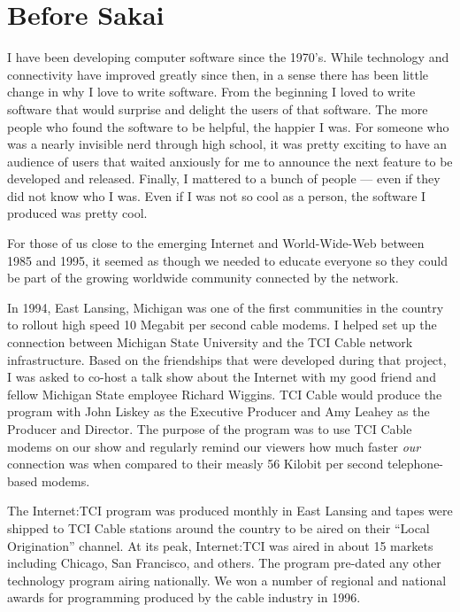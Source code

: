 \documentclass[12pt]{book}
\begin{document}
\tableofcontents

\mainmatter

\chapter{Before Sakai}

I have been developing computer software since the 1970's.  While
technology and connectivity have
improved greatly since then, in a sense there has been little change
in why I love to write software.  From the beginning I loved
to write software that would surprise and delight the users of
that software.  The more people who found the software
to be helpful, the happier I was.   For someone who was a nearly
invisible nerd through high school, it was pretty exciting to have
an audience of users that waited anxiously for me to announce
the next feature to be developed and released.  Finally, I mattered
to a bunch of people --- even if they did not know who I was.  Even if
I was not so cool as a person, the software I produced was pretty cool.

For those of us close to the emerging Internet and World-Wide-Web
between 1985 and 1995, it seemed as though we needed to
educate everyone so they could be part of the growing worldwide
community connected by the network.

In 1994, East Lansing, Michigan was one of the first communities
in the country to rollout high speed 10 Megabit per second cable
modems.  I helped set up the connection between Michigan State
University and the TCI Cable network infrastructure.   Based on the
friendships that were developed during that project, I was asked
to co-host a talk show about the Internet with my good friend
and fellow Michigan State employee Richard Wiggins.  TCI Cable
would produce the program with John Liskey as the Executive Producer
and Amy Leahey as the Producer and Director.  The purpose of
the program was to use TCI Cable modems
on our show and regularly remind our viewers how much
faster \emph{our} connection was when compared to their measly
56 Kilobit per second telephone-based modems.

The Internet:TCI program was produced monthly in East Lansing
and tapes were shipped to TCI Cable stations around the
country to be aired on
their ``Local Origination'' channel.   At its peak, Internet:TCI
was aired in about 15 markets including Chicago, San Francisco,
and others.   The program pre-dated any other technology program
airing nationally.  We won a number of regional and national awards
for programming produced by the cable industry in 1996.
\end{document}
